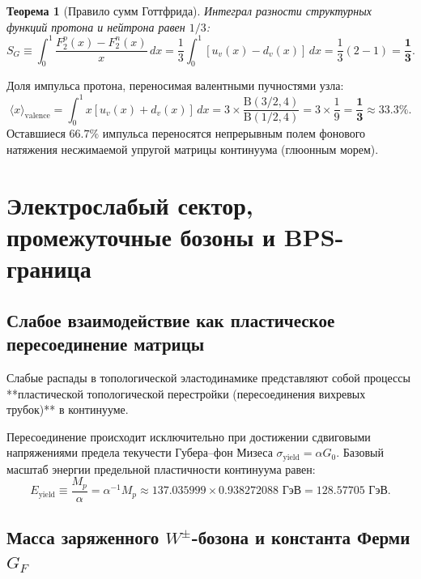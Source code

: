 \documentclass[11pt,a4paper,oneside]{article}
\theoremstyle{plain}
\newtheorem{theorem}{Теорема}[section]
\theoremstyle{definition}
\theoremstyle{remark}
\numberwithin{equation}{section}
\begin{document}
	\begin{theorem}[Правило сумм Готтфрида]
		Интеграл разности структурных функций протона и нейтрона равен $1/3$:
		\begin{equation}
			S_G \equiv \int_0^1 \frac{F_2^p(x) - F_2^n(x)}{x} \, dx = \frac{1}{3} \int_0^1 [u_v(x) - d_v(x)] \, dx = \frac{1}{3} (2 - 1) = \mathbf{\frac{1}{3}}.
		\end{equation}
	\end{theorem}
	
	Доля импульса протона, переносимая валентными пучностями узла:
	\begin{equation}
		\langle x \rangle_{\text{valence}} = \int_0^1 x [u_v(x) + d_v(x)] \, dx = 3 \times \frac{\mathrm{B}(3/2, 4)}{\mathrm{B}(1/2, 4)} = 3 \times \frac{1}{9} = \mathbf{\frac{1}{3} \approx 33.3\%}.
	\end{equation}
	Оставшиеся $66.7\%$ импульса переносятся непрерывным полем фонового натяжения несжимаемой упругой матрицы континуума (глюонным морем).
	
	\section{Электрослабый сектор, промежуточные бозоны и BPS-граница}
	
	\subsection{Слабое взаимодействие как пластическое пересоединение матрицы}
	
	Слабые распады в топологической эластодинамике представляют собой процессы **пластической топологической перестройки (пересоединения вихревых трубок)** в континууме.
	
	Пересоединение происходит исключительно при достижении сдвиговыми напряжениями предела текучести Губера--фон Мизеса $\sigma_{\text{yield}} = \alpha G_0$. Базовый масштаб энергии предельной пластичности континуума равен:
	\begin{equation}
		E_{\text{yield}} \equiv \frac{M_p}{\alpha} = \alpha^{-1} M_p \approx 137.035999 \times 0.938272088 \text{ ГэВ} = \mathbf{128.57705 \text{ ГэВ}}.
	\end{equation}
	
	\subsection{Масса заряженного $W^\pm$-бозона и константа Ферми $G_F$}
	
\end{document}
